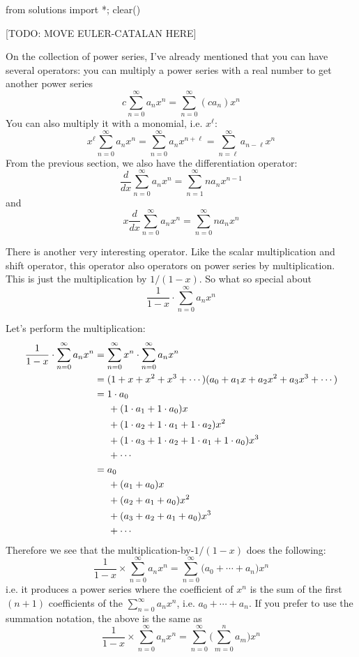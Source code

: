 \begin{python0}
from solutions import *; clear() 
\end{python0}

[TODO: MOVE EULER-CATALAN HERE]

On the collection of power series, 
I've already mentioned that you can have several operators:
you can multiply a power series with a real number to get another power series
\[
c \sum_{n=0}^\infty a_n x^n = \sum_{n = 0}^\infty (ca_n) x^n
\]
You can also multiply it with a monomial, i.e. $x^\ell$:
\[
x^\ell \sum_{n=0}^\infty a_n x^n 
= \sum_{n = 0}^\infty a_n x^{n + \ell} 
= \sum_{n = \ell}^\infty a_{n - \ell }x^n
\]
From the previous section, we also have the differentiation
operator:
\[
\frac{d}{dx} \sum_{n=0}^\infty a_n x^n = \sum_{n = 1}^\infty na_n x^{n-1}
\]
and
\[
x\frac{d}{dx} \sum_{n=0}^\infty a_n x^n = \sum_{n = 0}^\infty na_n x^n 
\]

There is another very interesting operator.
Like the scalar multiplication and shift operator, this operator
also operators on power series by multiplication.
This is just the multiplication by $1/(1-x)$.
So what so special about 
\[
\frac{1}{1-x} \cdot \sum_{n=0}^\infty a_n x^n
\]

Let's perform the multiplication:
\begin{align*}
\frac{1}{1-x} \cdot \sum_{n=0}^\infty a_n x^n
&= \sum_{n=0}^\infty x^n \cdot \sum_{n=0}^\infty a_n x^n \\
&= (1 + x + x^2 + x^3 + \cdots )( a_0 + a_1 x + a_2 x^2 + a_3 x^3 + \cdots) \\
&= 1 \cdot a_0 \\
&\hskip 0.5cm + (1 \cdot a_1 + 1 \cdot a_0) x \\
&\hskip 0.5cm + (1 \cdot a_2 + 1 \cdot a_1 + 1 \cdot a_2) x^2 \\
&\hskip 0.5cm + (1 \cdot a_3 + 1 \cdot a_2 + 1 \cdot a_1 + 1 \cdot a_0) x^3 \\
&\hskip 0.5cm + \cdots \\
&= a_0 \\
&\hskip 0.5cm + (a_1 + a_0) x \\
&\hskip 0.5cm + (a_2 + a_1 + a_0) x^2 \\
&\hskip 0.5cm + (a_3 + a_2 + a_1 + a_0) x^3 \\
&\hskip 0.5cm + \cdots
\end{align*}
Therefore we see that
the multiplication-by-$1/(1-x)$ does the following: 
\[
\frac{1}{1-x} \times \sum_{n=0}^\infty a_n x^n
= \sum_{n=0}^\infty \biggl( a_0 + \cdots + a_n \biggr) x^n
\]
i.e. it produces a power series where the coefficient of $x^n$ is the
sum of the first $(n+1)$ coefficients of the $\sum_{n = 0}^\infty a_nx^n$, 
i.e. $a_0 + \cdots + a_n$.
If you prefer to use the summation notation, the above is the same as
\[
\frac{1}{1-x} \times \sum_{n=0}^\infty a_n x^n
= \sum_{n=0}^\infty \biggl( \sum_{m=0}^n a_m \biggl) x^n
\]


